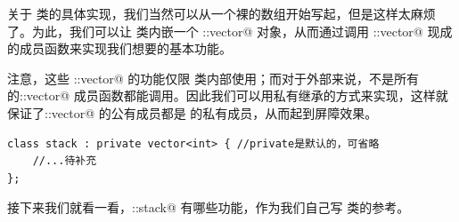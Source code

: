 关于 \lstinline@stack@ 类的具体实现，我们当然可以从一个裸的数组开始写起，但是这样太麻烦了。为此，我们可以让 \lstinline@stack@ 类内嵌一个 \lstinline@std::vector@ 对象，从而通过调用 \lstinline@std::vector@ 现成的成员函数来实现我们想要的基本功能。\par
注意，这些 \lstinline@std::vector@ 的功能仅限 \lstinline@stack@ 类内部使用；而对于外部来说，不是所有的\newline\lstinline@std::vector@ 成员函数都能调用。因此我们可以用私有继承的方式来实现，这样就保证了\newline\lstinline@std::vector@ 的公有成员都是 \lstinline@stack@ 的私有成员，从而起到屏障效果。
\begin{lstlisting}
class stack : private vector<int> { //private是默认的，可省略
    //...待补充
};
\end{lstlisting}
接下来我们就看一看，\lstinline@std::stack@ 有哪些功能，作为我们自己写 \lstinline@stack@ 类的参考。\par
